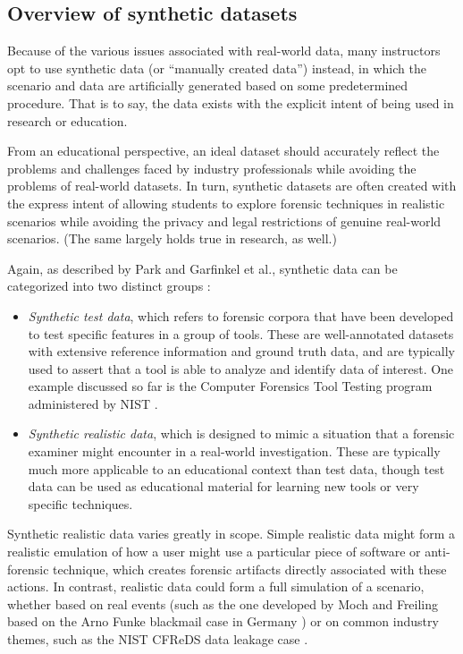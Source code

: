 \documentclass[letterpaper,12pt]{report}
\def\tightlist{}
\begin{document}
\subsection{Overview of synthetic
datasets}\label{overview-of-synthetic-datasets}

Because of the various issues associated with real-world data, many
instructors opt to use synthetic data (or ``manually created data'')
instead, in which the scenario and data are artificially generated based
on some predetermined procedure. That is to say, the data exists with
the explicit intent of being used in research or education.

From an educational perspective, an ideal dataset should accurately
reflect the problems and challenges faced by industry professionals
while avoiding the problems of real-world datasets. In turn, synthetic
datasets are often created with the express intent of allowing students
to explore forensic techniques in realistic scenarios while avoiding the
privacy and legal restrictions of genuine real-world scenarios. (The
same largely holds true in research, as well.)

Again, as described by Park and Garfinkel et al., synthetic data can be
categorized into two distinct groups
\cite{garfinkelBringingScienceDigital2009,parkTREDEVMPOPCultivating2018}:

\begin{itemize}
\tightlist
\item
  \emph{Synthetic test data}, which refers to forensic corpora that have
  been developed to test specific features in a group of tools. These
  are well-annotated datasets with extensive reference information and
  ground truth data, and are typically used to assert that a tool is
  able to analyze and identify data of interest. One example discussed
  so far is the Computer Forensics Tool Testing program administered by
  NIST
  \cite{nationalinstituteofstandardsandtechnologyComputerForensicsTool2017}.
\item
  \emph{Synthetic realistic data}, which is designed to mimic a
  situation that a forensic examiner might encounter in a real-world
  investigation. These are typically much more applicable to an
  educational context than test data, though test data can be used as
  educational material for learning new tools or very specific
  techniques.
\end{itemize}

Synthetic realistic data varies greatly in scope. Simple realistic data
might form a realistic emulation of how a user might use a particular
piece of software or anti-forensic technique, which creates forensic
artifacts directly associated with these actions. In contrast, realistic
data could form a full simulation of a scenario, whether based on real
events (such as the one developed by Moch and Freiling based on the Arno
Funke blackmail case in Germany
\cite{mochForensicImageGenerator2009}) or on common industry themes,
such as the NIST CFReDS data leakage case
\cite{nationalinstituteofstandardsandtechnologyCFReDSDataLeakage}.
\end{document}
